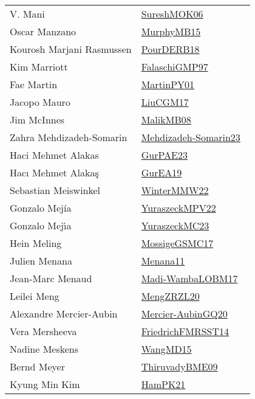 {\begin{longtable}{p{4cm}p{20cm}}
V. Mani & \href{}{SureshMOK06}~\cite{SureshMOK06}\\
Oscar Manzano & \href{papers/MurphyMB15.pdf}{MurphyMB15}~\cite{MurphyMB15}\\
Kourosh Marjani Rasmussen & \href{articles/PourDERB18.pdf}{PourDERB18}~\cite{PourDERB18}\\
Kim Marriott & \href{articles/FalaschiGMP97.pdf}{FalaschiGMP97}~\cite{FalaschiGMP97}\\
Fae Martin & \href{articles/MartinPY01.pdf}{MartinPY01}~\cite{MartinPY01}\\
Jacopo Mauro & \href{papers/LiuCGM17.pdf}{LiuCGM17}~\cite{LiuCGM17}\\
Jim McInnes & \href{}{MalikMB08}~\cite{MalikMB08}\\
Zahra Mehdizadeh{-}Somarin & \href{papers/Mehdizadeh-Somarin23.pdf}{Mehdizadeh-Somarin23}~\cite{Mehdizadeh-Somarin23}\\
Haci Mehmet Alakas & \href{articles/GurPAE23.pdf}{GurPAE23}~\cite{GurPAE23}\\
Hacı Mehmet Alakaş & \href{articles/GurEA19.pdf}{GurEA19}~\cite{GurEA19}\\
Sebastian Meiswinkel & \href{papers/WinterMMW22.pdf}{WinterMMW22}~\cite{WinterMMW22}\\
Gonzalo Mej{\'i}a & \href{articles/YuraszeckMPV22.pdf}{YuraszeckMPV22}~\cite{YuraszeckMPV22}\\
Gonzalo Mej{\'{\i}}a & \href{papers/YuraszeckMC23.pdf}{YuraszeckMC23}~\cite{YuraszeckMC23}\\
Hein Meling & \href{papers/MossigeGSMC17.pdf}{MossigeGSMC17}~\cite{MossigeGSMC17}\\
Julien Menana & \href{}{Menana11}~\cite{Menana11}\\
Jean{-}Marc Menaud & \href{papers/Madi-WambaLOBM17.pdf}{Madi-WambaLOBM17}~\cite{Madi-WambaLOBM17}\\
Leilei Meng & \href{articles/MengZRZL20.pdf}{MengZRZL20}~\cite{MengZRZL20}\\
Alexandre Mercier{-}Aubin & \href{papers/Mercier-AubinGQ20.pdf}{Mercier-AubinGQ20}~\cite{Mercier-AubinGQ20}\\
Vera Mersheeva & \href{}{FriedrichFMRSST14}~\cite{FriedrichFMRSST14}\\
Nadine Meskens & \href{articles/WangMD15.pdf}{WangMD15}~\cite{WangMD15}\\
Bernd Meyer & \href{papers/ThiruvadyBME09.pdf}{ThiruvadyBME09}~\cite{ThiruvadyBME09}\\
Kyung Min Kim & \href{articles/HamPK21.pdf}{HamPK21}~\cite{HamPK21}\\

\end{longtable}}
